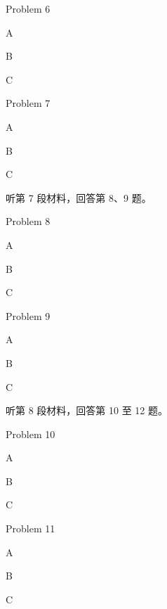 \documentclass{exam-zh}
\begin{document}
\begin{question}
Problem 6
\begin{choices}
\item A
\item B
\item C
\end{choices}
\end{question}

\begin{question}
Problem 7
\begin{choices}
\item A
\item B
\item C
\end{choices}
\end{question}

\begin{flushleft}
听第 7 段材料，回答第 8、9 题。
\end{flushleft}

\begin{question}
Problem 8
\begin{choices}
\item A
\item B
\item C
\end{choices}
\end{question}

\begin{question}
Problem 9
\begin{choices}
\item A
\item B
\item C
\end{choices}
\end{question}

\begin{flushleft}
听第 8 段材料，回答第 10 至 12 题。
\end{flushleft}

\begin{question}
Problem 10
\begin{choices}
\item A
\item B
\item C
\end{choices}
\end{question}

\begin{question}
Problem 11
\begin{choices}
\item A
\item B
\item C
\end{choices}
\end{question}
\end{document}
